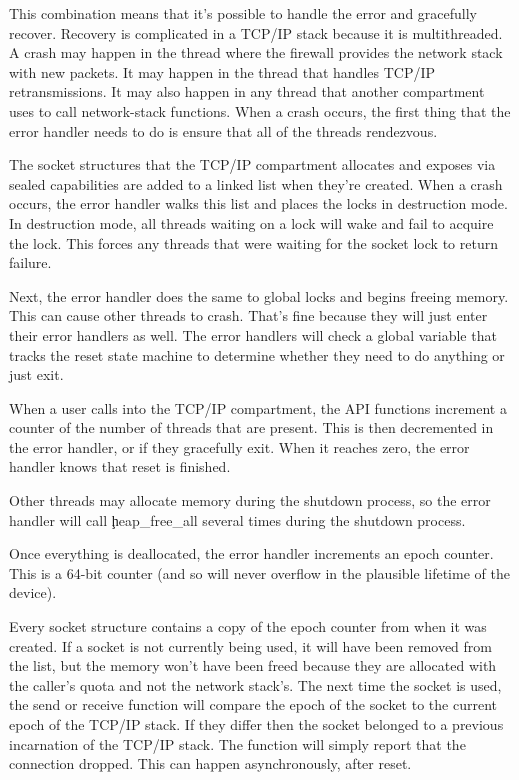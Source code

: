 This combination means that it's possible to handle the error and gracefully recover.
Recovery is complicated in a TCP/IP stack because it is multithreaded.
A crash may happen in the thread where the firewall provides the network stack with new packets.
It may happen in the thread that handles TCP/IP retransmissions.
It may also happen in any thread that another compartment uses to call network-stack functions.
When a crash occurs, the first thing that the error handler needs to do is ensure that all of the threads rendezvous.

The socket structures that the TCP/IP compartment allocates and exposes via sealed capabilities are added to a linked list when they're created.
When a crash occurs, the error handler walks this list and places the locks in destruction mode.
In destruction mode, all threads waiting on a lock will wake and fail to acquire the lock.
This forces any threads that were waiting for the socket lock to return failure.

Next, the error handler does the same to global locks and begins freeing memory.
This can cause other threads to crash.
That's fine because they will just enter their error handlers as well.
The error handlers will check a global variable that tracks the reset state machine to determine whether they need to do anything or just exit.

When a user calls into the TCP/IP compartment, the API functions increment a counter of the number of threads that are present.
This is then decremented in the error handler, or if they gracefully exit.
When it reaches zero, the error handler knows that reset is finished.

Other threads may allocate memory during the shutdown process, so the error handler will call \c{heap_free_all} several times during the shutdown process.

Once everything is deallocated, the error handler increments an epoch counter.
This is a 64-bit counter (and so will never overflow in the plausible lifetime of the device).

Every socket structure contains a copy of the epoch counter from when it was created.
If a socket is not currently being used, it will have been removed from the list, but the memory won't have been freed because they are allocated with the caller's quota and not the network stack's.
The next time the socket is used, the send or receive function will compare the epoch of the socket to the current epoch of the TCP/IP stack.
If they differ then the socket belonged to a previous incarnation of the TCP/IP stack.
The function will simply report that the connection dropped.
This can happen asynchronously, after reset.

